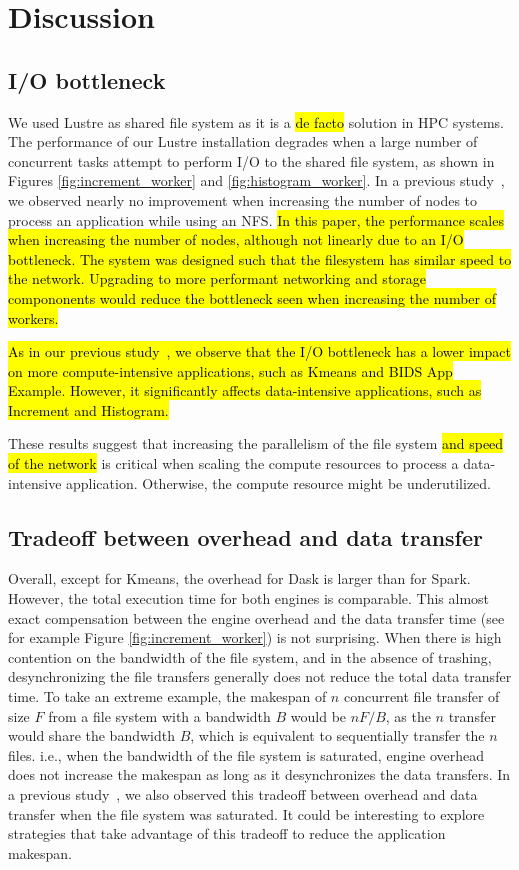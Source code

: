 \documentclass[AMA,STIX1COL]{WileyNJD-v2}
\newcommand{\HL}[1]{\hl{#1}}
\begin{document}
\section{Discussion}
\subsection{I/O bottleneck}
\label{subsec:io-bottleneck}
We used Lustre as shared file system as it is a \HL{de facto} solution in HPC systems.
The performance of our Lustre installation degrades when a large number of concurrent tasks attempt to perform I/O to the shared file system, as shown in Figures \ref{fig:increment_worker} and \ref{fig:histogram_worker}.
In a previous study~\cite{8943502}, we observed nearly no improvement when increasing the number of nodes to process an application while using an NFS.
\HL{In this paper, the performance scales when increasing the number of nodes, although not linearly due to an I/O bottleneck.
	The system was designed such that the filesystem has similar speed to the network.
Upgrading to more performant networking and storage compononents would reduce the bottleneck seen when increasing the number of workers.}
				
\HL{
	As in our previous study~{\cite{8943502}}, we observe that the I/O bottleneck has a lower impact on more compute-intensive applications, such as Kmeans and BIDS App Example.
	However, it significantly affects data-intensive applications, such as Increment and Histogram.
}
										
These results suggest that increasing the parallelism of the file system \HL{and speed of the network} is critical when scaling the compute resources to process a data-intensive application.
Otherwise, the compute resource might be underutilized.
										
\subsection{Tradeoff between overhead and data transfer}
\label{subsec:overhead-tradeoff}
Overall, except for Kmeans, the overhead for Dask is larger than for Spark.
However, the total execution time for both engines is comparable.
This almost exact compensation between the engine overhead and the data transfer time (see for example Figure \ref{fig:increment_worker}) is not surprising.
When there is high contention on the bandwidth of the file system, and in the absence of trashing, desynchronizing the file transfers generally does not reduce the total data transfer time.
To take an extreme example, the makespan of $n$ concurrent file transfer of size $F$ from a file system with a bandwidth $B$ would be $nF/B$,
as the $n$ transfer would share the bandwidth $B$, which is equivalent to sequentially transfer the $n$ files.
i.e., when the bandwidth of the file system is saturated, engine overhead does not increase the makespan as long as it desynchronizes the data transfers.
In a previous study~\cite{8943502}, we also observed this tradeoff between overhead and data transfer when the file system was saturated.
It could be interesting to explore strategies that take advantage of this tradeoff to reduce the application makespan.
										
\end{document}
